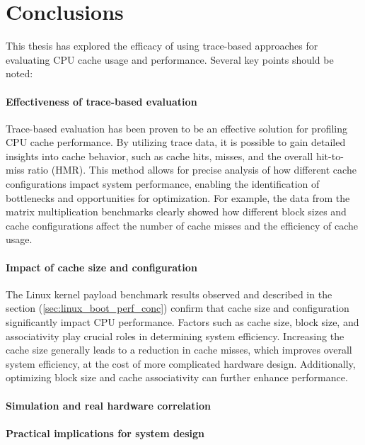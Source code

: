 
\chapter{Conclusions}

This thesis has explored the efficacy of using trace-based approaches for evaluating CPU cache usage and performance. Several key points should be noted:

\subsubsection*{Effectiveness of trace-based evaluation}

Trace-based evaluation has been proven to be an effective solution for profiling CPU cache performance.
By utilizing trace data, it is possible to gain detailed insights into cache behavior, such as cache hits, misses, and the overall hit-to-miss ratio (HMR). This method allows
for precise analysis of how different cache configurations impact system performance, enabling the identification of bottlenecks and opportunities for optimization.
For example, the data from the matrix multiplication benchmarks clearly showed how different block sizes and cache configurations affect the number of cache misses and the
efficiency of cache usage.

\subsubsection*{Impact of cache size and configuration}

The Linux kernel payload benchmark results observed and described in the section (\ref{sec:linux_boot_perf_conc}) confirm that cache size and configuration significantly impact CPU
performance. Factors such as cache size, block size, and associativity play crucial roles in determining system efficiency. Increasing the cache size generally leads to a reduction
in cache misses, which improves overall system efficiency, at the cost of more complicated hardware design. Additionally, optimizing block size and cache associativity can
further enhance performance.


\subsubsection*{Simulation and real hardware correlation}

\subsubsection*{Practical implications for system design}


